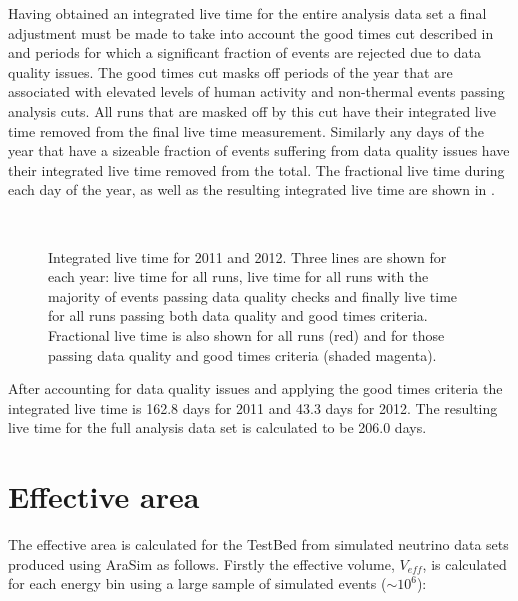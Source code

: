 Having obtained an integrated live time for the entire analysis data set a final adjustment must be made to take into account the good times cut described in  and periods for which a significant fraction of events are rejected due to data quality issues. The good times cut masks off periods of the year that are associated with elevated levels of human activity and non-thermal events passing analysis cuts. All runs that are masked off by this cut have their integrated live time removed from the final live time measurement. Similarly any days of the year that have a sizeable fraction of events suffering from data quality issues have their integrated live time removed from the total. The fractional live time during each day of the year, as well as the resulting integrated live time are shown in . 

\begin{figure}
  \hfill
  \\
  \hfill
  \caption{Integrated live time for 2011 and 2012. Three lines are shown for each year: live time for all runs, live time for all runs with the majority of events passing data quality checks and finally live time for all runs passing both data quality and good times criteria. Fractional live time is also shown for all runs (red) and for those passing data quality and good times criteria (shaded magenta).}
  \label{fig:Results:Integrated-LiveTime}
\end{figure}

After accounting for data quality issues and applying the good times criteria the integrated live time is 162.8 days for 2011 and 43.3 days for 2012. The resulting live time for the full analysis data set is calculated to be 206.0 days.


\section{Effective area}
\label{sec:Results:Effective-Area}

The effective area is calculated for the TestBed from simulated neutrino data sets produced using AraSim as follows. Firstly the effective volume, $V_{eff}$, is calculated for each energy bin using a large sample of simulated events ($\sim 10^{6}$):


